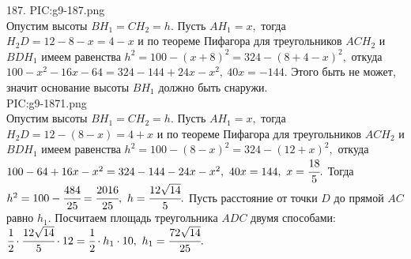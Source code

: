 187. {{PIC:g9-187.png}}\\
Опустим высоты $BH_1=CH_2=h.$ Пусть $AH_1=x,$ тогда $H_2D=12-8-x=4-x$ и по теореме Пифагора для треугольников $ACH_2$ и $BDH_1$ имеем равенства
$h^2=100-(x+8)^2=324-(8+4-x)^2,$ откуда $100-x^2-16x-64=324-144+24x-x^2,\ 40x=-144.$ Этого быть не может, значит основание высоты $BH_1$ должно быть снаружи.\\
 {{PIC:g9-1871.png}}\\
Опустим высоты $BH_1=CH_2=h.$ Пусть $AH_1=x,$ тогда $H_2D=12-(8-x)=4+x$ и по теореме Пифагора для треугольников $ACH_2$ и $BDH_1$ имеем равенства
$h^2=100-(8-x)^2=324-(12+x)^2,$ откуда $100-64+16x-x^2=324-144-24x-x^2,\ 40x=144,\ x=\cfrac{18}{5}.$ Тогда $h^2=100-\cfrac{484}{25}=\cfrac{2016}{25},\ h=\cfrac{12\sqrt{14}}{5}.$ Пусть расстояние от точки $D$ до прямой $AC$ равно $h_1.$ Посчитаем площадь треугольника $ADC$ двумя способами:
$\cfrac{1}{2}\cdot\cfrac{12\sqrt{14}}{5}\cdot12=
\cfrac{1}{2}\cdot h_1\cdot10,\ h_1=\cfrac{72\sqrt{14}}{25}.$\\
